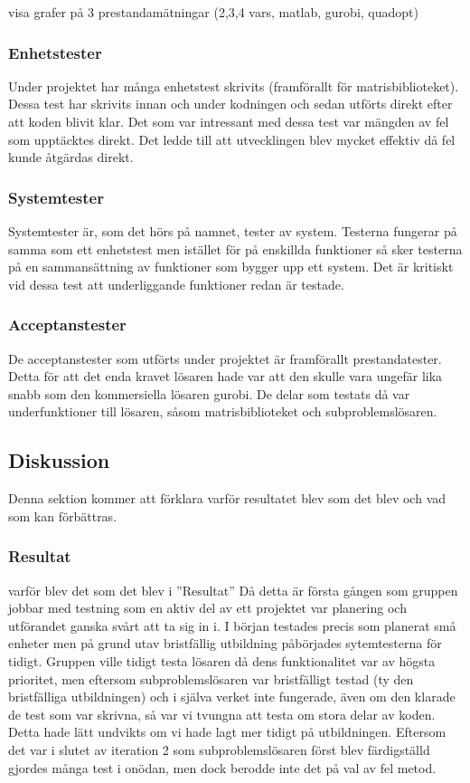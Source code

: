 	visa grafer på 3 prestandamätningar (2,3,4 vars, matlab, gurobi, quadopt) 	
	
	
	\subsubsection{Enhetstester}
	Under projektet har många enhetstest skrivits (framförallt för matrisbiblioteket). Dessa test har skrivits innan och under kodningen och sedan utförts direkt efter att koden blivit klar. Det som var intressant med dessa test var mängden av fel som upptäcktes direkt. Det ledde till att utvecklingen blev mycket effektiv då fel kunde åtgärdas direkt.
	\subsubsection{Systemtester}
	Systemtester är, som det hörs på namnet, tester av system. Testerna fungerar på samma som ett enhetstest men istället för på enskillda funktioner så sker testerna på en sammansättning av funktioner som bygger upp ett system. Det är kritiskt vid dessa test att underliggande funktioner redan är testade.
	\subsubsection{Acceptanstester}
	De acceptanstester som utförts under projektet är framförallt prestandatester. Detta för att det enda kravet lösaren hade var att den skulle vara ungefär lika snabb som den kommersiella lösaren gurobi. De delar som testats då var underfunktioner till lösaren, såsom matrisbiblioteket och subproblemslösaren.
	
	\subsection{Diskussion}
	Denna sektion kommer att förklara varför resultatet blev som det blev och vad som kan förbättras.	
	
	\subsubsection{Resultat}
	varför blev det som det blev i ''Resultat'' \newline
	Då detta är första gången som gruppen jobbar med testning som en aktiv del av ett projektet var planering och utförandet ganska svårt att ta sig in i. I början testades precis som planerat små enheter men på grund utav bristfällig utbildning påbörjades sytemtesterna för tidigt. Gruppen ville tidigt testa lösaren då dens funktionalitet var av högsta prioritet, men eftersom subproblemslösaren var bristfälligt testad (ty den bristfälliga utbildningen) och i själva verket inte fungerade, även om den klarade de test som var skrivna, så var vi tvungna att testa om stora delar av koden. Detta hade lätt undvikts om vi hade lagt mer tidigt på utbildningen. Eftersom det var i slutet av iteration 2 som subproblemslösaren först blev färdigställd gjordes många test i onödan, men dock berodde inte det på val av fel metod. 
	
